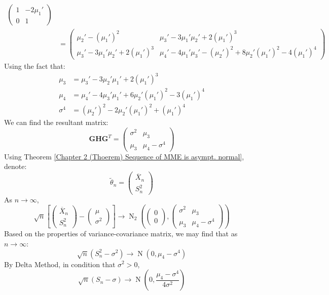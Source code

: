 \documentclass{huhtakm-template-book-v2}
\DeclareMathOperator{\N}{N}
\begin{document}
\begin{eg}
\begin{align*}
\begin{pmatrix}
			1 & -2\mu_{1}'\\
			0 & 1
		\end{pmatrix}\\
		&=\begin{pmatrix}
			\mu_{2}'-(\mu_{1}')^{2} & \mu_{3}'-3\mu_{1}'\mu_{2}'+2(\mu_{1}')^{3}\\
			\mu_{3}'-3\mu_{1}'\mu_{2}'+2(\mu_{1}')^{3} & \mu_{4}'-4\mu_{1}'\mu_{3}'-(\mu_{2}')^{2}+8\mu_{2}'(\mu_{1}')^{2}-4(\mu_{1}')^{4}
		\end{pmatrix}
	\end{align*}
	Using the fact that:
	\begin{align*}
		\mu_{3}&=\mu_{3}'-3\mu_{2}'\mu_{1}'+2(\mu_{1}')^{3}\\ \mu_{4}&=\mu_{4}'-4\mu_{3}'\mu_{1}'+6\mu_{2}'(\mu_{1}')^{2}-3(\mu_{1}')^{4}\\
		\sigma^{4}&=(\mu_{2}')^{2}-2\mu_{2}'(\mu_{1}')^{2}+(\mu_{1}')^{4}
	\end{align*}
	We can find the resultant matrix:
	\begin{equation*}
		\mathbf{GHG}^{T}=\begin{pmatrix}
			\sigma^{2} & \mu_{3}\\
			\mu_{3} & \mu_{4}-\sigma^{4}
		\end{pmatrix}
	\end{equation*}
	Using Theorem \ref{Chapter 2 (Thoerem) Sequence of MME is asympt. normal}, denote:
	\begin{equation*}
		\widetilde{\theta}_{n}=\begin{pmatrix}
			\overline{X}_{n}\\ S_{n}^{2}
		\end{pmatrix}
	\end{equation*}
	As $n\to\infty$,
	\begin{equation*}
		\sqrt{n}\left[\begin{pmatrix}
			\overline{X}_{n}\\ S_{n}^{2}
		\end{pmatrix}-\begin{pmatrix}
			\mu\\ \sigma^{2}
		\end{pmatrix}\right]\to\N_{2}\left(\begin{pmatrix}
			0\\ 0
		\end{pmatrix},\begin{pmatrix}
			\sigma^{2} & \mu_{3}\\
			\mu_{3} & \mu_{4}-\sigma^{4}
		\end{pmatrix}\right)
	\end{equation*}
	Based on the properties of variance-covariance matrix, we may find that as $n\to\infty$:
	\begin{equation*}
		\sqrt{n}(S_{n}^{2}-\sigma^{2})\to\N(0,\mu_{4}-\sigma^{4})
	\end{equation*}
	By Delta Method, in condition that $\sigma^{2}>0$,
	\begin{equation*}
		\sqrt{n}(S_{n}-\sigma)\to\N\left(0,\frac{\mu_{4}-\sigma^{4}}{4\sigma^{2}}\right)
	\end{equation*}
\end{eg}
\end{document}
